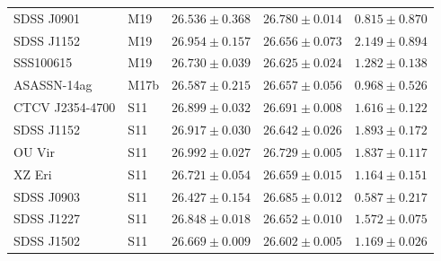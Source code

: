 \begin{table}
\begin{tabular}{llccc}
        SDSS J0901      &  M19      & $26.536 \pm 0.368$    & $26.780 \pm 0.014$    & $0.815 \pm 0.870$ \\
        SDSS J1152      &  M19      & $26.954 \pm 0.157$    & $26.656 \pm 0.073$    & $2.149 \pm 0.894$ \\
        SSS100615       &  M19      & $26.730 \pm 0.039$    & $26.625 \pm 0.024$    & $1.282 \pm 0.138$ \\
        ASASSN-14ag     &  M17b     & $26.587 \pm 0.215$    & $26.657 \pm 0.056$    & $0.968 \pm 0.526$ \\
        CTCV J2354-4700 &  S11      & $26.899 \pm 0.032$    & $26.691 \pm 0.008$    & $1.616 \pm 0.122$ \\
        SDSS J1152      &  S11      & $26.917 \pm 0.030$    & $26.642 \pm 0.026$    & $1.893 \pm 0.172$ \\
        OU Vir          &  S11      & $26.992 \pm 0.027$    & $26.729 \pm 0.005$    & $1.837 \pm 0.117$ \\
        XZ Eri          &  S11      & $26.721 \pm 0.054$    & $26.659 \pm 0.015$    & $1.164 \pm 0.151$ \\
        SDSS J0903      &  S11      & $26.427 \pm 0.154$    & $26.685 \pm 0.012$    & $0.587 \pm 0.217$ \\
        SDSS J1227      &  S11      & $26.848 \pm 0.018$    & $26.652 \pm 0.010$    & $1.572 \pm 0.075$ \\
        SDSS J1502      &  S11      & $26.669 \pm 0.009$    & $26.602 \pm 0.005$    & $1.169 \pm 0.026$ \\

\end{tabular}
\end{table}
